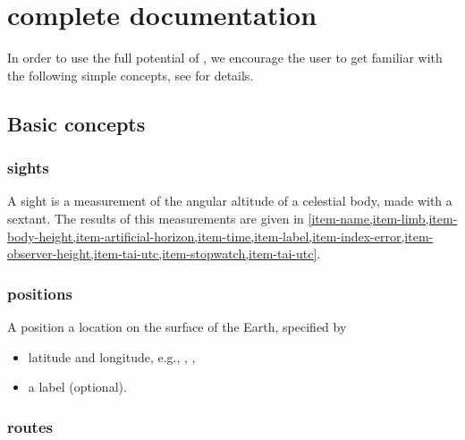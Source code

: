 \documentclass{ol-softwaremanual}
\begin{document}
\acresetall


\section{\thel complete documentation}



In order to use the full potential of \thel, we encourage the user to get familiar with the following simple concepts, see \cite{bowditch2002the} for details. 

\subsection{Basic concepts}

\subsubsection{\Glspl{sight}} \label{section-sights} 

A \gls{sight} is a measurement of the angular altitude of a celestial \gls{body}, made with a \gls{sextant}. 
The results of this measurements are given in  \cref{item-name,item-limb,item-body-height,item-artificial-horizon,item-time,item-label,item-index-error,item-observer-height,item-tai-utc,item-stopwatch,item-tai-utc}. 



\subsubsection{\Glspl{position}}  \label{section-positions} 

A \gls{position} a  location on the surface of the Earth, specified by 
\begin{itemize}
\item latitude and longitude, e.g., , ,
\item a label (optional).
\end{itemize}
\subsubsection{\Glspl{route}} \label{section-routes} 
\end{document}
